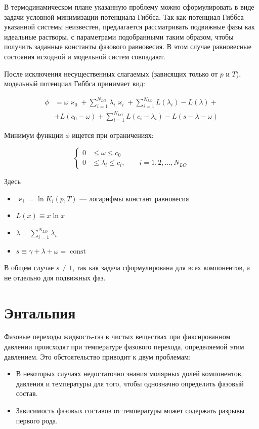 \documentclass[12pt]{article}
\renewcommand{\leq}{\leqslant}
\begin{document}
В термодинамическом плане указанную проблему можно сформулировать в виде задачи условной минимизации потенциала Гиббса. Так как потенциал Гиббса указанной системы неизвестен, предлагается рассматривать подвижные фазы как идеальные растворы, с параметрами подобранными таким образом, чтобы получить заданные константы фазового равновесия. В этом случае равновесные состояния исходной и модельной систем совпадают.

После исключения несущественных слагаемых (зависящих только от $p$ и $T$), модельный потенциал Гиббса принимает вид:

\begin{equation}
\begin{aligned}
{\phi} &= \omega \varkappa_0 + \sum_{i=1}^{N_{LO}} \lambda_i \varkappa_i + \sum_{i=1}^{N_{LO}} L(\lambda_i) - L(\lambda) + \\
&+ L(c_0 - \omega) + \sum_{i=1}^{N_{LO}} L(c_i - \lambda_i) - L(s - \lambda - \omega)
\end{aligned}
\label{eq:pproblem}
\end{equation}

Минимум функции $\phi$ ищется при ограничениях:

\begin{equation}
\left\{
\begin{aligned}
0& \leq \omega \leq c_0\\
0& \leq \lambda_i \leq c_i, \qquad i = 1,2,\dots,N_{LO}
\end{aligned}
\right. \label{eq:restr}
\end{equation}

Здесь
\begin{itemize}
\item $\varkappa_i = \ln K_i(p, T)$ --- логарифмы констант равновесия 
\item $L(x) \equiv x \ln x$
\item $\lambda = \sum_{i=1}^{N_{LO}} \lambda_i$ 
\item $s \equiv \gamma + \lambda + \omega = \operatorname{const}$
\end{itemize}

В общем случае $s \ne 1$, так как задача сформулирована для всех компонентов, а не отдельно для подвижных фаз.



\section{Энтальпия}
Фазовые переходы жидкость-газ в чистых веществах при фиксированном давлении происходят при температуре фазового перехода, определяемой этим давлением. Это обстоятельство приводит к двум проблемам:
\begin{itemize}
\item В некоторых случаях недостаточно знания молярных долей компонентов, давления и температуры для того, чтобы однозначно определить фазовый состав.
\item Зависимость фазовых составов от температуры может содержать разрывы первого рода.
\end{itemize}
\end{document}
